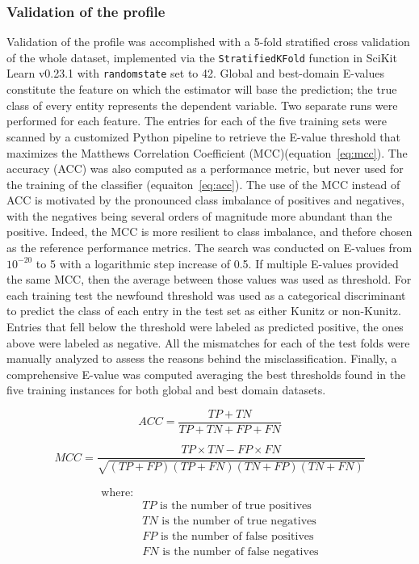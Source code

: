 \documentclass[nocrop]{bioinfo}
\begin{document}
\begin{methods}
\subsubsection{Validation of the profile}
Validation of the profile was accomplished with a 5-fold stratified cross validation of the whole dataset, implemented via the \texttt{StratifiedKFold} function in SciKit Learn v0.23.1 \citep{scikitlearn2011} with \texttt{random\textunderscore state} set to 42.
Global and best-domain E-values constitute the feature on which the estimator will base the prediction; the true class of every entity represents the dependent variable.
Two separate runs were performed for each feature. 
The entries for each of the five training sets were scanned by a customized Python pipeline to retrieve the E-value threshold that maximizes the Matthews Correlation Coefficient (MCC)(equation~\ref{eq:mcc}). 
The accuracy (ACC) was also computed as a performance metric, but never used for the training of the classifier (equaiton~\ref{eq:acc}). 
The use of the MCC instead of ACC is motivated by the pronounced class imbalance of positives and negatives, with the negatives being several orders of magnitude more abundant than the positive. Indeed, the MCC is more resilient to class imbalance, and thefore chosen as the reference performance metrics. 
The search was conducted on E-values from $10^{-20}$ to 5 with a logarithmic step increase of 0.5.
If multiple E-values provided the same MCC, then the average between those values was used as threshold.
For each training test the newfound threshold was used as a categorical discriminant to predict the class of each entry in the test set as either Kunitz or non-Kunitz.
Entries that fell below the threshold were labeled as predicted positive, the ones above were labeled as negative.
All the mismatches for each of the test folds were manually analyzed to assess the reasons behind the misclassification.
Finally, a comprehensive E-value was computed averaging the best thresholds found in the five training instances for both global and best domain datasets. 


\begin{equation}
\label{eq:acc}
ACC = \frac{TP + TN}{TP + TN + FP + FN} 
\end{equation}

\begin{equation}
\label{eq:mcc}
MCC = \frac{TP \times TN - FP \times FN}{\sqrt{(TP+FP)(TP+FN)(TN+FP)(TN+FN)}} 
\end{equation}

\begin{align*}
\text{where:}\\
&TP \text{ is the number of true positives}\\
&TN \text{ is the number of true negatives}\\
&FP \text{ is the number of false positives}\\
&FN \text{ is the number of false negatives}
\end{align*}
\end{methods}
\end{document}
